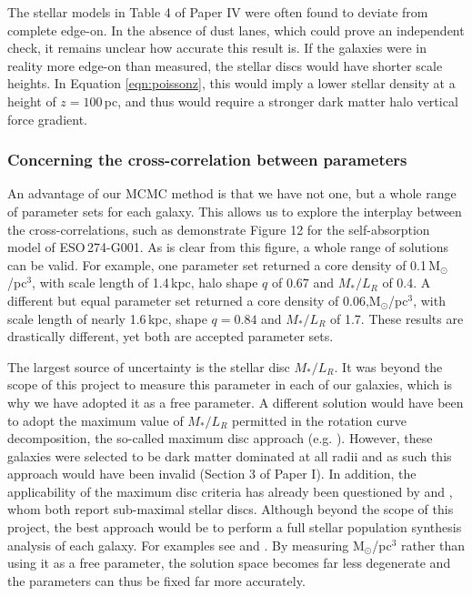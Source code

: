 \documentclass[useAMS,usenatbib]{mn2e}
\begin{document}
The stellar models in Table 4 of Paper IV were often found to 
deviate from complete edge-on. 
In the absence of dust lanes, which could prove an independent check, it 
remains unclear how accurate this result is.
If the galaxies were in reality more edge-on than measured, the stellar 
discs would have shorter scale heights. 
In Equation \ref{eqn:poissonz}, this would imply a lower stellar density 
at a height of $z=100$\,pc, and thus would require a stronger dark matter 
halo vertical force gradient.

\subsubsection{Concerning the cross-correlation between parameters}
An advantage of our MCMC method is that we have not one, but a whole 
range of parameter sets for each galaxy. 
This allows us to explore the interplay between the cross-correlations, 
such as demonstrate Figure 12 for the 
self-absorption model of ESO\,274-G001.
As is clear from this figure, a whole range of solutions can be valid. 
For example, one parameter set returned a core density of
 0.1\,M$_\odot$/pc$^3$, with scale length of 1.4\,kpc, halo 
shape $q$ of $0.67$ and $M_*/L_R$ of 0.4. 
A different but equal parameter set returned a core density of 
$0.06$,M$_\odot$/pc$^3$, with scale length of nearly 1.6\,kpc, shape 
$q=0.84$ and $M_*/L_R$ of 1.7.
These results are drastically different, yet both are accepted parameter sets. 

The largest source of uncertainty is the stellar disc $M_*/L_R$. 
It was beyond the scope of this project to measure this parameter 
in each of our galaxies, which is why we have adopted it as a free parameter.
A different solution would have been to adopt the maximum value of 
$M_*/L_R$ permitted in the rotation curve decomposition, the so-called 
maximum disc approach (e.g. \citet{Carignan1985,vanAlbada1985A}). 
However, these galaxies were selected to be dark matter dominated at all 
radii and as such this approach would have been invalid 
(Section 3 of Paper I).
In addition, the applicability of the maximum disc criteria has 
already been questioned  by \citet{Kregel2005} and \citet{Martinsson2013}, 
whom both report sub-maximal stellar discs.
Although beyond the scope of this project, the best approach would be to 
perform a full stellar population synthesis analysis of each galaxy. For 
examples see \citet{Bruzual2003} and \citet{Maraston2005}.
By measuring M$_\odot$/pc$^3$ rather than using it as a free parameter, the 
solution space becomes far less degenerate and the parameters can thus be 
fixed far more accurately.
\end{document}
